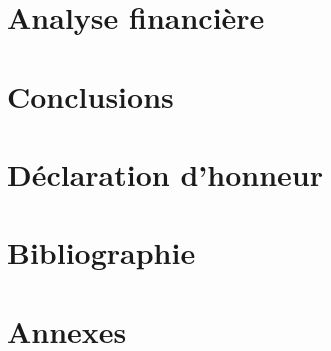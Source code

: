 \documentclass[a4paper, 12pt, DIV=12]{scrartcl}
\begin{document}
\section{Analyse financière}
\newpage

\section{Conclusions}
\newpage

\section{Déclaration d'honneur}
\newpage

\section{Bibliographie}
\printbibliography{}
\newpage

\section*{Annexes}
\end{document}
